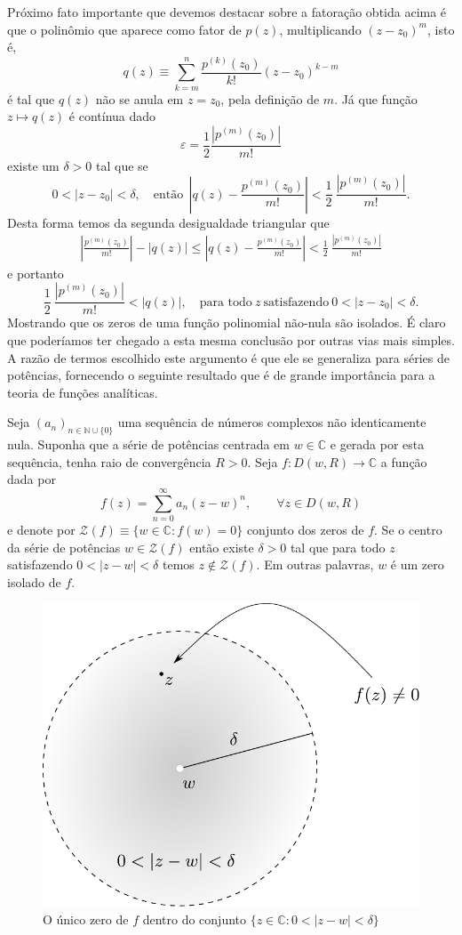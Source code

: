 Próximo fato importante que devemos destacar sobre a fatoração obtida acima é que 
o polinômio que aparece como fator de $p(z)$, multiplicando $(z-z_0)^m$, isto é,
\[
q(z) \equiv \sum_{k=m}^{n}\frac{p^{(k)}(z_0)}{k!}(z-z_0)^{k-m} 
\]
é tal que $q(z)$ não se anula em $z=z_0$, pela definição de $m$. 
Já que função $z\longmapsto q(z)$ é contínua dado 
\[ 
\varepsilon = \frac{1}{2}\frac{|p^{(m)}(z_0)|}{m!} 
\]
existe um $\delta>0$ tal que se 
\[
0<|z-z_0|<\delta, 
\quad\text{então}\ \ 
\left| q(z) - \frac{p^{(m)}(z_0)}{m!}\right|
<
\frac{1}{2}\ \frac{|p^{(m)}(z_0)|}{m!}.
\]
Desta forma temos da segunda desigualdade triangular que
\begin{align*}
\left|\frac{p^{(m)}(z_0)}{m!}\right| - |q(z)| 
\leqslant 
\left| q(z) - \frac{p^{(m)}(z_0)}{m!}\right|
<
\frac{1}{2}\ \frac{|p^{(m)}(z_0)|}{m!}
\end{align*}
e portanto 
\[
\frac{1}{2}\ \frac{|p^{(m)}(z_0)|}{m!} <|q(z)|, 
\quad \text{para todo}\ z\ \text{satisfazendo}\ 0<|z-z_0|<\delta.
\]
Mostrando que os zeros de uma função polinomial não-nula 
são isolados. É claro que poderíamos ter chegado a esta mesma conclusão 
por outras vias mais simples. A razão de termos escolhido este argumento é que
ele se generaliza para séries de potências, fornecendo o seguinte
resultado que é de grande importância para a teoria de funções analíticas.


\begin{lema}\label{lema-centro-serie-zero-isolado}
Seja $(a_n)_{n\in\mathbb{N}\cup\{0\}}$ uma sequência de números complexos
não identicamente nula. Suponha que a série de potências 
centrada em $w\in\mathbb{C}$ e gerada por esta sequência, 
tenha raio de convergência $R>0$. 
Seja $f:D(w,R)\to\mathbb{C}$ a função dada por
\[
f(z) = \sum_{n=0}^{\infty}a_n(z-w)^n, \qquad \forall z\in D(w,R)
\]
e denote por $\mathcal{Z}(f)\equiv \{w\in\mathbb{C}: f(w)=0\}$ 
conjunto dos zeros de $f$.  Se o centro da série de potências 
$w\in \mathcal{Z}(f)$ então existe $\delta>0$ tal que 
para todo $z$ satisfazendo $0<|z-w|<\delta$ temos $z\notin \mathcal{Z}(f)$.
Em outras palavras, $w$ é um zero isolado de $f$.
\end{lema}

\begin{figure}[h]
\centering
\includegraphics[width=0.45\linewidth]{Figuras/zeros-isolados1}
\caption{O único zero de $f$ dentro do conjunto $\{z\in\mathbb{C}: 0<|z-w|<\delta\}$}
\label{fig:zeros-isolados1}
\end{figure}



